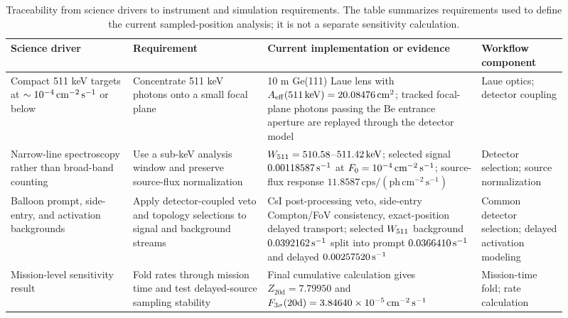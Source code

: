 \begin{table}[t]
\centering
\caption{Traceability from science drivers to instrument and simulation requirements. The table summarizes requirements used to define the current sampled-position analysis; it is not a separate sensitivity calculation.}
\label{tab:requirements_traceability}
\footnotesize
\begin{tabular}{@{}p{0.20\linewidth}p{0.22\linewidth}p{0.35\linewidth}p{0.14\linewidth}@{}}
\toprule
Science driver & Requirement & Current implementation or evidence & Workflow component \\
\midrule
Compact 511 keV targets at $\sim10^{-4}\,\mathrm{cm^{-2}\,s^{-1}}$ or below & Concentrate 511 keV photons onto a small focal plane & 10 m Ge(111) Laue lens with $A_{\mathrm{eff}}(511\,\mathrm{keV})=20.08476\,\mathrm{cm^2}$; tracked focal-plane photons passing the Be entrance aperture are replayed through the detector model & Laue optics; detector coupling \\
Narrow-line spectroscopy rather than broad-band counting & Use a sub-keV analysis window and preserve source-flux normalization & $W_{511}=510.58$--$511.42\,\mathrm{keV}$; selected signal $0.00118587\,\mathrm{s^{-1}}$ at $F_{0}=10^{-4}\,\mathrm{cm^{-2}\,s^{-1}}$; source-flux response $11.8587\,\mathrm{cps}/(\mathrm{ph\,cm^{-2}\,s^{-1}})$ & Detector selection; source normalization \\
Balloon prompt, side-entry, and activation backgrounds & Apply detector-coupled veto and topology selections to signal and background streams & CsI post-processing veto, side-entry Compton/FoV consistency, exact-position delayed transport; selected $W_{511}$ background $0.0392162\,\mathrm{s^{-1}}$ split into prompt $0.0366410\,\mathrm{s^{-1}}$ and delayed $0.00257520\,\mathrm{s^{-1}}$ & Common detector selection; delayed activation modeling \\
Mission-level sensitivity result & Fold rates through mission time and test delayed-source sampling stability & Final cumulative calculation gives $Z_{20\mathrm{d}}=7.79950$ and $F_{3\sigma}(20\mathrm{d})=3.84640\times10^{-5}\,\mathrm{cm^{-2}\,s^{-1}}$ & Mission-time fold; rate calculation \\
\bottomrule
\end{tabular}
\end{table}
